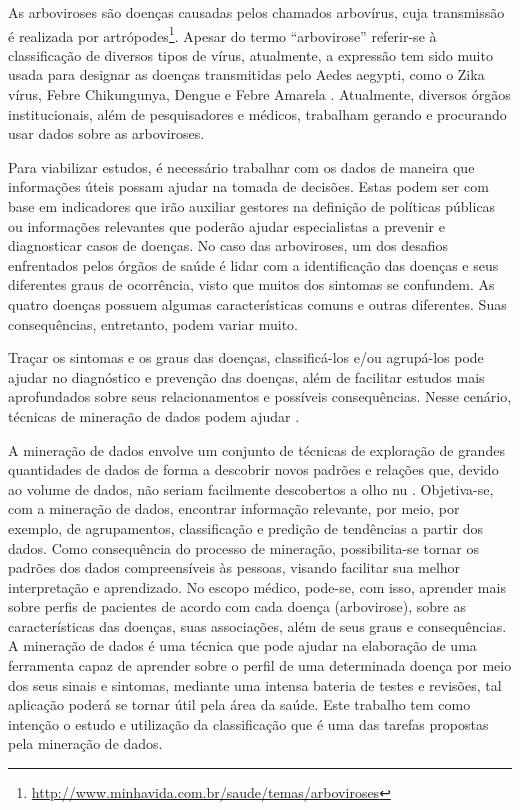 As arboviroses são doenças causadas pelos chamados arbovírus, cuja transmissão é realizada por artrópodes\footnote{\url{http://www.minhavida.com.br/saude/temas/arboviroses}}. Apesar do termo “arbovirose” referir-se à classificação de diversos tipos de vírus, atualmente, a expressão tem sido muito usada para designar as doenças transmitidas pelo Aedes aegypti, como o Zika vírus, Febre Chikungunya, Dengue e Febre Amarela \cite{IOC2018,CDCP2018}. Atualmente, diversos órgãos institucionais, além de pesquisadores e médicos, trabalham gerando e procurando usar dados sobre as arboviroses.

Para viabilizar estudos, é necessário trabalhar com os dados de maneira que informações úteis possam ajudar na tomada de decisões. Estas podem ser com base em indicadores que irão auxiliar gestores na definição de políticas públicas ou informações relevantes que poderão ajudar especialistas a prevenir e diagnosticar casos de doenças. No caso das arboviroses, um dos desafios enfrentados pelos órgãos de saúde é lidar com a identificação das doenças e seus diferentes graus de ocorrência, visto que muitos dos sintomas se confundem. As quatro doenças possuem algumas características comuns e outras diferentes. Suas consequências, entretanto, podem variar muito. 

Traçar os sintomas e os graus das doenças, classificá-los e/ou agrupá-los pode ajudar no diagnóstico e prevenção das doenças, além de facilitar estudos mais aprofundados sobre seus relacionamentos e possíveis consequências.  Nesse cenário, técnicas de mineração de dados podem ajudar \cite{han2012,Witten2016}.

A mineração de dados envolve um conjunto de técnicas de exploração de grandes quantidades de dados de forma a descobrir novos padrões e relações que, devido ao volume de dados, não seriam facilmente descobertos a olho nu \cite{han2012,Witten2016}. Objetiva-se, com a mineração de dados, encontrar informação relevante, por meio, por exemplo, de agrupamentos, classificação e predição de tendências a partir dos dados. Como consequência do processo de mineração, possibilita-se tornar os padrões dos dados compreensíveis às pessoas, visando facilitar sua melhor interpretação e aprendizado. No escopo médico, pode-se, com isso, aprender mais sobre perfis de pacientes de acordo com cada doença (arbovirose), sobre as características das doenças, suas associações, além de seus graus e consequências. A mineração de dados é uma técnica que pode ajudar na elaboração de uma ferramenta capaz de aprender sobre o perfil de uma determinada doença por meio dos seus sinais e sintomas, mediante uma intensa bateria de testes e revisões, tal aplicação poderá se tornar útil pela área da saúde. Este trabalho tem como intenção o estudo e utilização da classificação que é uma das tarefas propostas pela mineração de dados.


